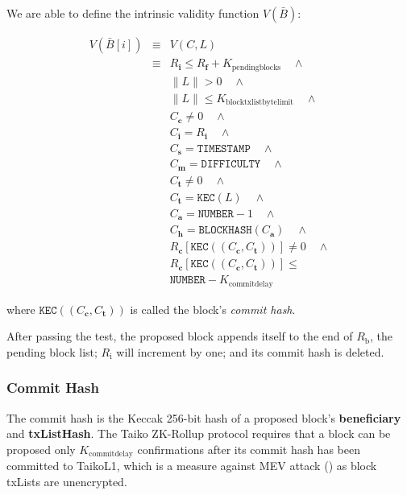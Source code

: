 \documentclass[9pt,oneside]{amsart}
\begin{document}
\begin{multicols}{2}
We are able to define the intrinsic validity function $V(\bar{B})$:

\begin{eqnarray}
V(\bar{B}[i]) & \equiv &   V(C,L)  \\
\nonumber & \equiv &   R_\mathbf{i} \le R_\mathbf{f} + K_\mathrm{pendingblocks}   \quad \wedge \\
\nonumber& & \lVert L \rVert > 0 \quad \wedge \\
\nonumber & & \lVert L \rVert \le K_{\mathrm{blocktxlistbytelimit}} \quad \wedge \\
\nonumber& & C_{\mathbf{c}} \ne 0   \quad \wedge \\
\nonumber& & C_{\mathbf{i}} = R_\mathbf{i}   \quad \wedge \\
\nonumber& & C_{\mathbf{s}} = \texttt{TIMESTAMP}   \quad \wedge \\
\nonumber& & C_{\mathbf{m}} = \texttt{DIFFICULTY}   \quad \wedge \\
\nonumber& & C_{\mathbf{t}} \ne 0   \quad \wedge \\
\nonumber& & C_{\mathbf{t}} = \texttt{KEC}(L)   \quad \wedge \\
\nonumber& & C_{\mathbf{a}} = \texttt{NUMBER} - 1   \quad \wedge \\
\nonumber& & C_{\mathbf{h}} = \texttt{BLOCKHASH}(C_{\mathbf{a}})   \quad \wedge \\
\nonumber& & R_{\mathbf{c}}[\texttt{KEC}((C_{\mathbf{c}}, C_{\mathbf{t}}))] \ne 0  \quad \wedge \\
\nonumber& & R_{\mathbf{c}}[\texttt{KEC}((C_{\mathbf{c}}, C_{\mathbf{t}}))] \le  \\
\nonumber& &  \texttt{NUMBER}   -  K_{\mathrm{commitdelay}}
\end{eqnarray}

where $\texttt{KEC}((C_{\mathbf{c}}, C_{\mathbf{t}}))$ is called the block's \textit{commit hash}.

After passing the test, the proposed block appends itself to the end of $R_\mathrm{b}$, the pending block list; $R_\mathrm{i}$ will increment by one; and its commit hash is deleted.


\subsubsection{Commit Hash} The commit hash is the Keccak 256-bit hash of a proposed block's \textbf{beneficiary} and \textbf{txListHash}. The Taiko ZK-Rollup protocol requires that a block can be proposed only \small{$K_{\mathrm{commitdelay}}$} confirmations after its commit hash has been committed to  {TaikoL1}, which is a measure against MEV attack (\cite{mevethfoundation}) as block txLists are unencrypted.


\end{multicols}
\end{document}
